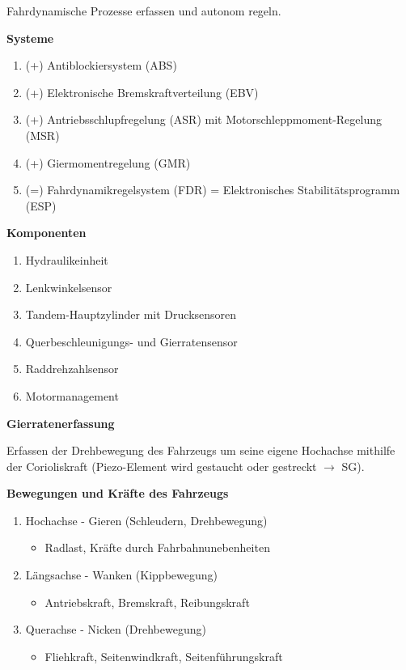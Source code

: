 Fahrdynamische Prozesse erfassen und autonom regeln.

\textbf{Systeme}

\begin{enumerate}
\item
  (+) Antiblockiersystem (ABS)
\item
  (+) Elektronische Bremskraftverteilung (EBV)
\item
  (+) Antriebsschlupfregelung (ASR) mit Motorschleppmoment-Regelung
  (MSR)
\item
  (+) Giermomentregelung (GMR)
\item
  (=) Fahrdynamikregelsystem (FDR) = Elektronisches Stabilitätsprogramm
  (ESP)
\end{enumerate}

\textbf{Komponenten}

\begin{enumerate}
\item
  Hydraulikeinheit
\item
  Lenkwinkelsensor
\item
  Tandem-Hauptzylinder mit Drucksensoren
\item
  Querbeschleunigungs- und Gierratensensor
\item
  Raddrehzahlsensor
\item
  Motormanagement
\end{enumerate}

\textbf{Gierratenerfassung}

Erfassen der Drehbewegung des Fahrzeugs um seine eigene Hochachse
mithilfe der Corioliskraft (Piezo-Element wird gestaucht oder gestreckt
$\to$ SG).

\textbf{Bewegungen und Kräfte des Fahrzeugs}

\begin{enumerate}
\item
  Hochachse - Gieren (Schleudern, Drehbewegung)

  \begin{itemize}
  \item
    Radlast, Kräfte durch Fahrbahnunebenheiten
  \end{itemize}
\item
  Längsachse - Wanken (Kippbewegung)

  \begin{itemize}
  \item
    Antriebskraft, Bremskraft, Reibungskraft
  \end{itemize}
\item
  Querachse - Nicken (Drehbewegung)

  \begin{itemize}
  \item
    Fliehkraft, Seitenwindkraft, Seitenführungskraft
  \end{itemize}
\end{enumerate}
